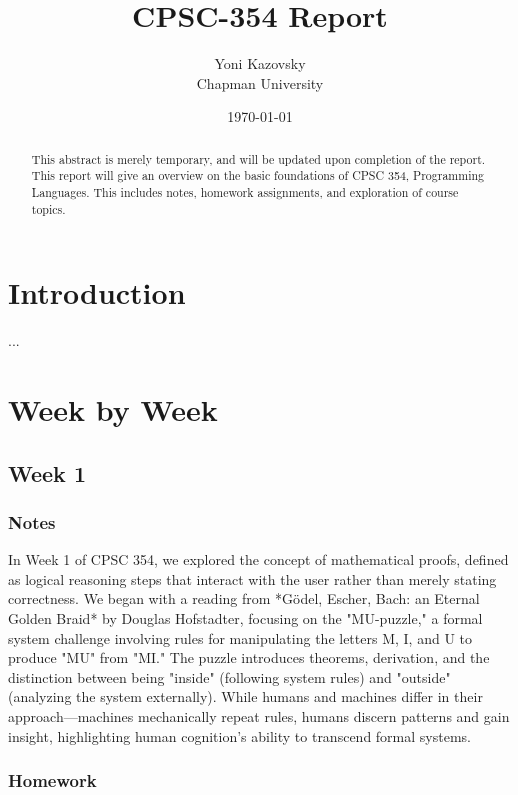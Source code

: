 \documentclass{article}
\title{CPSC-354 Report}
\author{Yoni Kazovsky  \\ Chapman University}
\date{\today}
\theoremstyle{theorem}
\theoremstyle{definition}
\theoremstyle{remark}
\begin{document}
\maketitle

\begin{abstract}
This abstract is merely temporary, and will be updated upon completion of the report. This report will give an overview on the basic foundations of CPSC 354, Programming Languages. This includes notes, homework assignments, and exploration of course topics.
\end{abstract}

\setcounter{tocdepth}{3}
\tableofcontents

\section{Introduction}\label{intro}

...

\section{Week by Week}\label{homework}

\subsection{Week 1}



\subsubsection*{Notes}

In Week 1 of CPSC 354, we explored the concept of mathematical proofs, defined as logical reasoning steps that interact with the user rather than merely stating correctness. We began with a reading from *Gödel, Escher, Bach: an Eternal Golden Braid* by Douglas Hofstadter, focusing on the "MU-puzzle," a formal system challenge involving rules for manipulating the letters M, I, and U to produce "MU" from "MI." The puzzle introduces theorems, derivation, and the distinction between being "inside" (following system rules) and "outside" (analyzing the system externally). While humans and machines differ in their approach—machines mechanically repeat rules, humans discern patterns and gain insight, highlighting human cognition's ability to transcend formal systems.
\subsubsection*{Homework}
\end{document}
